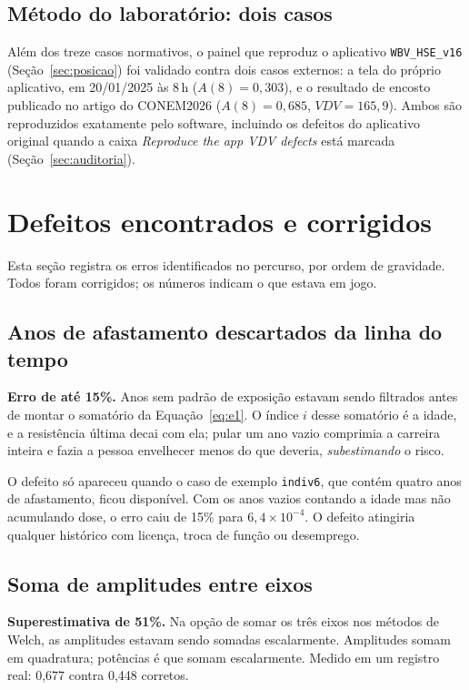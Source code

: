 \documentclass[11pt,a4paper]{article}
\newcommand{\code}[1]{\texttt{\small #1}}
\begin{document}
\subsection{Método do laboratório: dois casos}

Além dos treze casos normativos, o painel que reproduz o aplicativo
\code{WBV\_HSE\_v16} (Seção~\ref{sec:posicao}) foi validado contra dois casos
externos: a tela do próprio aplicativo, em 20/01/2025 às 8\,h ($A(8) =
0{,}303$), e o resultado de encosto publicado no artigo do CONEM2026
($A(8) = 0{,}685$, $VDV = 165{,}9$). Ambos são reproduzidos exatamente pelo
software, incluindo os defeitos do aplicativo original quando a caixa
\emph{Reproduce the app VDV defects} está marcada (Seção~\ref{sec:auditoria}).

\section{Defeitos encontrados e corrigidos}

Esta seção registra os erros identificados no percurso, por ordem de gravidade.
Todos foram corrigidos; os números indicam o que estava em jogo.

\subsection{Anos de afastamento descartados da linha do tempo}

\textbf{Erro de até 15\%.} Anos sem padrão de exposição estavam sendo filtrados
antes de montar o somatório da Equação~\eqref{eq:e1}. O índice $i$ desse
somatório é a idade, e a resistência última decai com ela; pular um ano vazio
comprimia a carreira inteira e fazia a pessoa envelhecer menos do que deveria,
\emph{subestimando} o risco.

O defeito só apareceu quando o caso de exemplo \code{indiv6}, que contém quatro
anos de afastamento, ficou disponível. Com os anos vazios contando a idade mas
não acumulando dose, o erro caiu de 15\% para $6{,}4\times10^{-4}$. O defeito
atingiria qualquer histórico com licença, troca de função ou desemprego.

\subsection{Soma de amplitudes entre eixos}

\textbf{Superestimativa de 51\%.} Na opção de somar os três eixos nos métodos de
Welch, as amplitudes estavam sendo somadas escalarmente. Amplitudes somam em
quadratura; potências é que somam escalarmente. Medido em um registro real:
0,677 contra 0,448 corretos.
\end{document}
